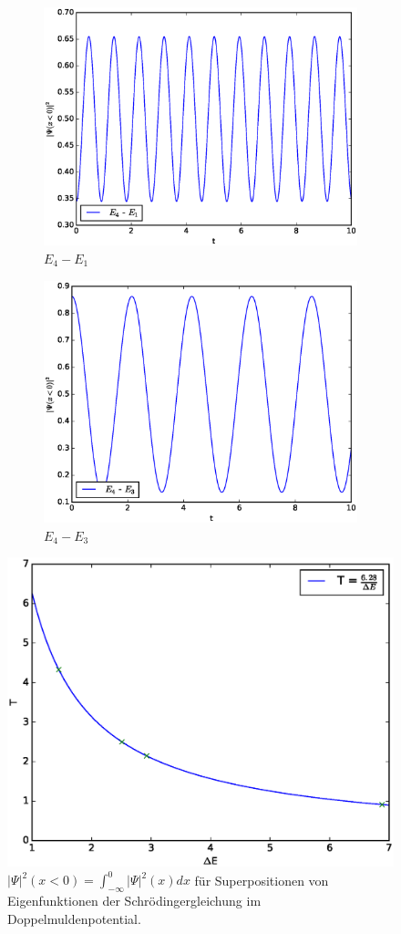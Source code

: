 \documentclass[a4paper, 11pt]{scrartcl}
\begin{document}
\begin{figure}[H]
\begin{subfigure}[b]{0.5\linewidth}
  \includegraphics[width=0.9\linewidth]{probability_left41} 
  \caption{$E_4 - E_1$} 
  \label{fig:41} 
\end{subfigure}%
\begin{subfigure}[b]{0.5\linewidth}
  \centering
  \includegraphics[width=0.9\linewidth]{probability_left43} 
  \caption{$E_4 - E_3$} 
  \label{fig:43} 
\end{subfigure}
\caption{$\vert \Psi \vert^2 (x < 0) = \int_{-\infty}^{0} \vert \Psi \vert^2(x) dx$ für Superpositionen von Eigenfunktionen der Schrödingergleichung im Doppelmuldenpotential.}
\label{fig:left_prob}
%
\centering
\includegraphics[width = .7\textwidth]{periodicity}

\end{figure}
\end{document}
